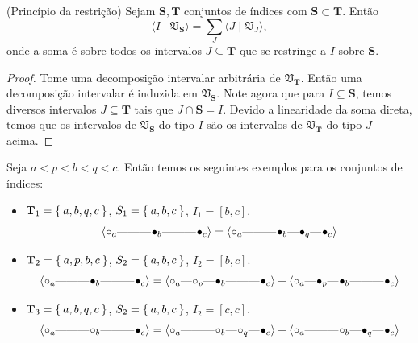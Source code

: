 \begin{propo}{(Princípio da restrição)}
    Sejam $\mathbf{S}, \mathbf{T}$ conjuntos de índices com $\mathbf{S} \subset \mathbf{T}$. Então
    \begin{equation*}
        \langle I \mid \mathfrak{V}_{\mathbf{S}} \rangle = 
        \sum_{J} \langle J \mid \mathfrak{V}_{J} \rangle,
    \end{equation*}
    onde a soma é sobre todos os intervalos $J \subseteq \mathbf{T}$ que se restringe a 
    $I$ sobre $\mathbf{S}$. 
\end{propo}
\begin{proof}   
    Tome uma decomposição intervalar arbitrária de $\mathfrak{V}_{\mathbf{T}}$. Então uma decomposição
    intervalar é induzida em $\mathfrak{V}_{\mathbf{S}}$. Note agora que para $I \subseteq \mathbf{S}$,
    temos diversos intervalos $J \subseteq \mathbf{T}$ tais que $J \cap \mathbf{S} = I$. Devido a 
    linearidade da soma direta, temos que os intervalos de $\mathfrak{V}_{\mathbf{S}}$ do tipo $I$ 
    são os intervalos de $\mathfrak{V}_{\mathbf{T}}$ do tipo $J$ acima. 
\end{proof}
\begin{ex}
    Seja $a < p < b < q < c$. Então temos os seguintes exemplos para os conjuntos de índices:
    \begin{itemize}
        \item $\mathbf{T}_1 = \Set{a,b,q,c}$, $S_1=\Set{a,b,c}$, $I_1=[b,c]$.
        \begin{equation*}
            \innerproduct{\qoff{a} \qem \qno \qem \qon{b} \qem \qno \qem \qon{c}} =
            \innerproduct{\qoff{a} \qem \qno \qem \qon{b} \qem \qon{q} \qem \qon{c}} 
        \end{equation*}
        \item $\mathbf{T}_2 = \Set{a,p,b,c}$, $S_2=\Set{a,b,c}$, $I_2=[b,c]$.
        \begin{equation*}
            \innerproduct{\qoff{a} \qem \qno \qem \qon{b} \qem \qno \qem \qon{c}} =
            \innerproduct{\qoff{a} \qem \qoff{p} \qem \qon{b} \qem \qno \qem \qon{c}}
            + \innerproduct{\qoff{a} \qem \qon{p} \qem \qon{b} \qem \qno \qem \qon{c}} 
        \end{equation*}
        \item $\mathbf{T}_3 = \Set{a,b,q,c}$, $S_2=\Set{a,b,c}$, $I_2=[c,c]$.
        \begin{equation*}
            \innerproduct{\qoff{a} \qem \qno \qem \qoff{b} \qem \qno \qem \qon{c}} =
            \innerproduct{\qoff{a} \qem \qno \qem \qoff{b} \qem \qoff{q} \qem \qon{c}}
            + \innerproduct{\qoff{a} \qem \qno \qem \qoff{b} \qem \qon{q} \qem \qon{c}} 
        \end{equation*}
         
    \end{itemize}
\end{ex}

